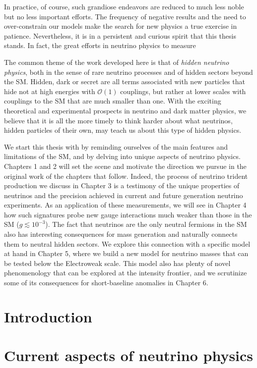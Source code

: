 \documentclass[openany,twoside,frontopenright,chaprunninghead]{ip3thesis}
\begin{document}
In practice, of course, such grandiose endeavors are reduced to much less noble but no less important efforts. The frequency of negative results and the need to over-constrain our models make the search for new physics a true exercise in patience. Nevertheless, it is in a persistent and curious spirit that this thesis stands. In fact, the great efforts in neutrino physics to measure 

The common theme of the work developed here is that of \emph{hidden neutrino physics}, both in the sense of rare neutrino processes and of hidden sectors beyond the SM. Hidden, dark or secret are all terms associated with new particles that hide not at high energies with $\mathscr{O}(1)$ couplings, but rather at lower scales with couplings to the SM that are much smaller than one. With the exciting theoretical and experimental prospects in neutrino and dark matter physics, we believe that it is all the more timely to think harder about what neutrinos, hidden particles of their own, may teach us about this type of hidden physics. 

We start this thesis with by reminding ourselves of the main features and limitations of the SM, and by delving into unique aspects of neutrino physics. Chapters 1 and 2 will set the scene and motivate the direction we pursue in the original work of the chapters that follow. Indeed, the process of neutrino trident production we discuss in Chapter 3 is a testimony of the unique properties of neutrinos and the precision achieved in current and future generation neutrino experiments. As an application of these measurements, we will see in Chapter 4 how such signatures probe new gauge interactions much weaker than those in the SM ($g \lesssim 10^{-3}$). The fact that neutrinos are the only neutral fermions in the SM also has interesting consequences for mass generation and naturally connects them to neutral hidden sectors. We explore this connection with a specific model at hand in Chapter 5, where we build a new model for neutrino masses that can be tested below the Electroweak scale. This model also has plenty of novel phenomenology that can be explored at the intensity frontier, and we scrutinize some of its consequences for short-baseline anomalies in Chapter 6.

\chapter{Introduction}


\chapter{Current aspects of neutrino physics}
% 

\end{document}
